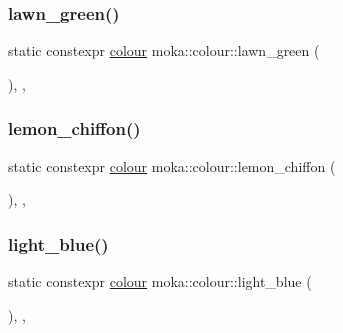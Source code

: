 \mbox{\label{classmoka_1_1colour_aa78d9ebdf53e2a9544c000b41049383b}} 
\subsubsection{\texorpdfstring{lawn\_green()}{lawn\_green()}}
{\footnotesize\ttfamily static constexpr \mbox{\hyperlink{classmoka_1_1colour}{colour}} moka\+::colour\+::lawn\+\_\+green (\begin{DoxyParamCaption}{ }\end{DoxyParamCaption})\hspace{0.3cm}{\ttfamily [inline]}, {\ttfamily [static]}, {\ttfamily [noexcept]}}

\mbox{\label{classmoka_1_1colour_a8089dc3cdbf507cad1267670e9a6908a}} 
\subsubsection{\texorpdfstring{lemon\_chiffon()}{lemon\_chiffon()}}
{\footnotesize\ttfamily static constexpr \mbox{\hyperlink{classmoka_1_1colour}{colour}} moka\+::colour\+::lemon\+\_\+chiffon (\begin{DoxyParamCaption}{ }\end{DoxyParamCaption})\hspace{0.3cm}{\ttfamily [inline]}, {\ttfamily [static]}, {\ttfamily [noexcept]}}

\mbox{\label{classmoka_1_1colour_a93f0616ef85c6092d04ce72c65002fe6}} 
\subsubsection{\texorpdfstring{light\_blue()}{light\_blue()}}
{\footnotesize\ttfamily static constexpr \mbox{\hyperlink{classmoka_1_1colour}{colour}} moka\+::colour\+::light\+\_\+blue (\begin{DoxyParamCaption}{ }\end{DoxyParamCaption})\hspace{0.3cm}{\ttfamily [inline]}, {\ttfamily [static]}, {\ttfamily [noexcept]}}

